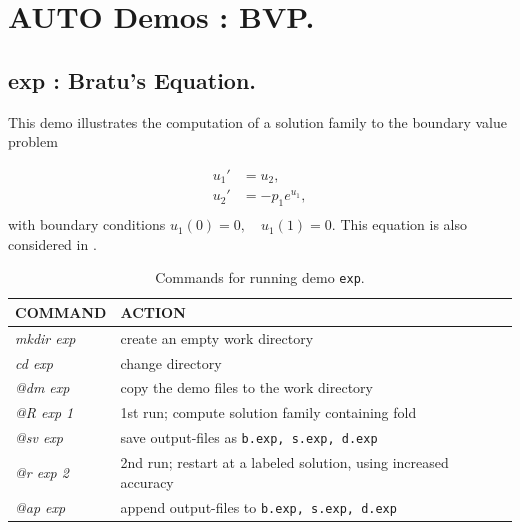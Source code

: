 \documentclass[12pt]{report}
\begin{document}
\chapter{ {\cal AUTO} Demos : BVP.} \label{ch:Demos_BVP}

\section{ exp : Bratu's Equation.} \label{sec:Demos_exp}
This demo illustrates the computation of a solution family to
the boundary value problem


\begin{equation} \begin{array}{cl}
  u_1 ' &= u_2  ,  \\
  u_2 ' &= -p_1  e^{u_1} , \\
\end{array} \end{equation}
with boundary conditions $ u_1(0)=0 ,  \quad  u_1(1)=0.$
This equation is also considered in 
 \citeyear{DoKeKe:91a}.
\begin{table}[htbp]
\begin{center}
\begin{tabular}{| l | l |}
\hline
  COMMAND  & ACTION \\
\hline
  {\it mkdir exp} & create an empty work directory \\ 
  {\it cd exp} & change directory \\
  {\it @dm exp} & copy the demo files to the work directory \\
\hline
  {\it @R exp 1} & 1st run; compute solution family containing fold \\ 
  {\it @sv exp} & save output-files as {\tt b.exp, s.exp, d.exp} \\ 
\hline
  {\it @r exp 2} & 2nd run; restart at a labeled solution, using increased accuracy \\ 
  {\it @ap exp} & append output-files to {\tt b.exp, s.exp, d.exp} \\ 
\hline
\end{tabular}
\caption{Commands for running demo {\tt exp}.}
\label{tbl:demo_exp}
\end{center}
\end{table}
\end{document}
